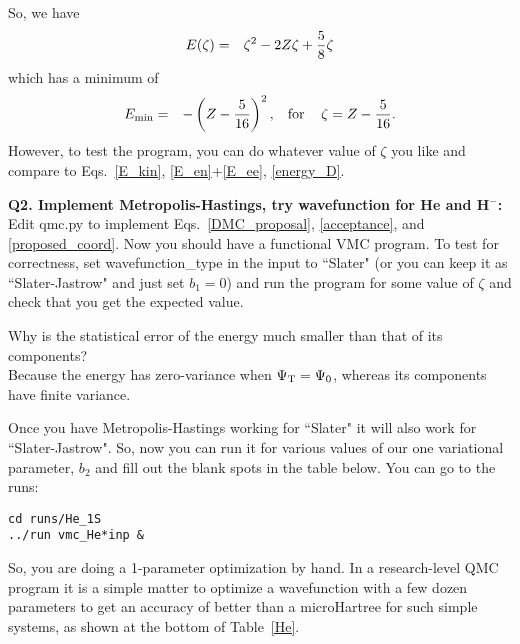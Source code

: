 \documentclass[11pt,aps,prb,amsmath,amssymb,superscriptaddress,notitlepage]{revtex4-1}
\def\beq{\begin{eqnarray}}
\def\eeq{\end{eqnarray}}
\begin{document}
So, we have
\beq
E(\zeta) &=& \zeta^2 -2 Z \zeta + {5 \over 8} \zeta
\label{energy_D}
\eeq
which has a minimum of
\beq
E_{\rm min} &=& -\left(Z - {5 \over 16} \right)^2, \mbox{\hskip 3mm for \hskip 3mm} \zeta=Z-{5 \over 16}.
\label{energy_D_min}
\eeq
However, to test the program, you can do whatever value of $\zeta$ you like and compare to Eqs.~\ref{E_kin},
\ref{E_en}+\ref{E_ee}, \ref{energy_D}.

{\color{blue}
\textbf{Q2. Implement Metropolis-Hastings, try wavefunction for He and H$^-$:}\\ 
Edit qmc.py to implement Eqs.~\ref{DMC_proposal}, \ref{acceptance}, and \ref{proposed_coord}.
Now you should have a functional VMC program.  To test for correctness, set wavefunction\_type in
the input to ``Slater" (or you can keep it as ``Slater-Jastrow" and just set $b_1=0$) and run
the program for some value of $\zeta$ and check that you get the expected value.

Why is the statistical error of the energy much smaller than that of its components?\\
{\color{darkgreen} Because the energy has zero-variance when $\Psi_{\rm T}={\Psi_0}$, whereas its components
have finite variance.}

\vskip 3mm
Once you have Metropolis-Hastings working for ``Slater" it will also work for ``Slater-Jastrow".
So, now you can run it for various values of our one variational parameter, $b_2$ and fill out
the blank spots in the table below.
You can go to the runs:
\begin{verbatim}
cd runs/He_1S
../run vmc_He*inp &
\end{verbatim}
So, you are doing a 1-parameter optimization by hand.  In a research-level QMC program it is a simple
matter to optimize a wavefunction with a few dozen parameters to get an accuracy of better than
a microHartree for such simple systems, as shown at the bottom of Table~\ref{He}.

}
\end{document}
